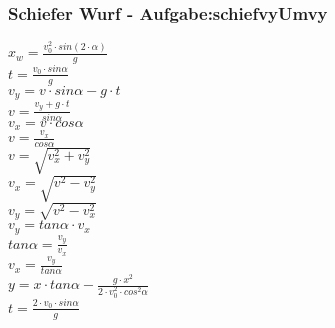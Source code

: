 \subsubsection{Schiefer Wurf  - Aufgabe:schiefvyUmvy} 
\begin{minipage}{0.45\textwidth} 
$ x_{w}  = \frac{v_{0} ^{2} \cdot sin(2\cdot \alpha )}{       g} $\\ 
$ t =\frac{v_{0} \cdot sin \alpha }{  g} $\\ 
$ v_{y}  =  v\cdot sin\alpha - g\cdot t $\\ 
$ v= \frac{ v_{y} +g\cdot t}{ sin\alpha } $\\ 
$ v_{x}  = v\cdot  cos\alpha $\\ 
$ v= \frac{ v_{x} }{ cos\alpha } $\\ 
$ v= \sqrt{ v_{x} ^{2} + v_{y} ^{2} } $\\ 
$ v_{x} = \sqrt{ v^{2}  - v_{y} ^{2} } $\\ 
$ v_{y} = \sqrt{ v^{2}  - v_{x} ^{2} } $\\ 
$ v_{y} = tan \alpha \cdot  v_{x} $\\ 
$ tan \alpha = \frac{v_{y} }{v_{x} } $\\ 
$ v_{x} = \frac{v_{y} }{tan \alpha } $\\ 
$ y = x\cdot tan \alpha  - \frac{   g\cdot x^{2} }{2\cdot v^{2} _{0} \cdot cos ^{2}\alpha } $\\ 
$ t =\frac{2\cdot v_{0} \cdot sin \alpha }{ g} $\\ 
\end{minipage} 
\begin{minipage}{0.45\textwidth} 
 
\end{minipage} 
